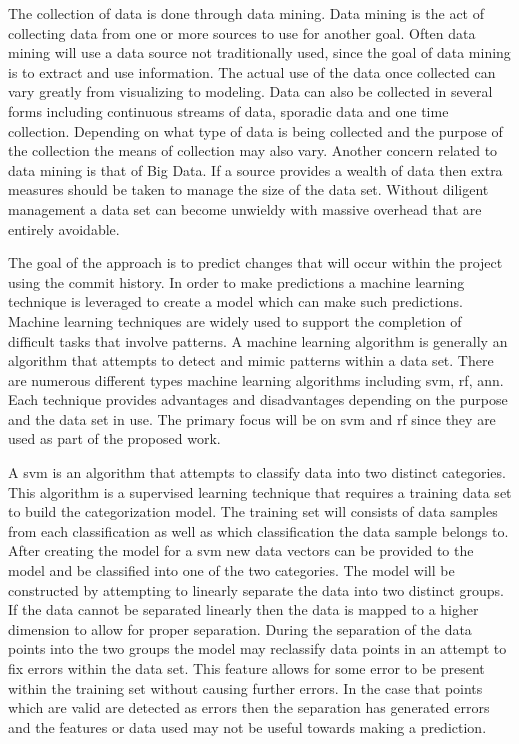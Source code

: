 The collection of data is done through data mining. Data mining is the act of collecting data from one or more sources to use for another goal. Often data mining will use a data source not traditionally used, since the goal of data mining is to extract and use information. The actual use of the data once collected can vary greatly from visualizing to modeling. Data can also be collected in several forms including continuous streams of data, sporadic data and one time collection. Depending on what type of data is being collected and the purpose of the collection the means of collection may also vary. Another concern related to data mining is that of Big Data. If a source provides a wealth of data then extra measures should be taken to manage the size of the data set. Without diligent management a data set can become unwieldy with massive overhead that are entirely avoidable.

The goal of the approach is to predict changes that will occur within the project using the commit history. In order to make predictions a machine learning technique is leveraged to create a model which can make such predictions. Machine learning techniques are widely used to support the completion of difficult tasks that involve patterns. A machine learning algorithm is generally an algorithm that attempts to detect and mimic patterns within a data set. There are numerous different types machine learning algorithms including \gls{svm}, \gls{rf}, \gls{ann}. Each technique provides advantages and disadvantages depending on the purpose and the data set in use. The primary focus will be on \gls{svm} and \gls{rf} since they are used as part of the proposed work. 

A \gls{svm} is an algorithm that attempts to classify data into two distinct categories. This algorithm is a supervised learning technique that requires a training data set to build the categorization model. The training set will consists of data samples from each classification as well as which classification the data sample belongs to. After creating the model for a \gls{svm} new data vectors can be provided to the model and be classified into one of the two categories. The model will be constructed by attempting to linearly separate the data into two distinct groups. If the data cannot be separated linearly then the data is mapped to a higher dimension to allow for proper separation. During the separation of the data points into the two groups the model may reclassify data points in an attempt to fix errors within the data set. This feature allows for some error to be present within the training set without causing further errors. In the case that points which are valid are detected as errors then the separation has generated errors and the features or data used may not be useful towards making a prediction.%

